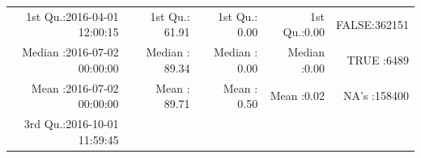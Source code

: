 \documentclass[
  10pt,
  a4paper,oneside]{article}
\begin{document}
\begin{longtable}[]{@{}rrrrr@{}}
\begin{minipage}[t]{0.27\columnwidth}
1st Qu.:2016-04-01 12:00:15\strut
\end{minipage} & \begin{minipage}[t]{0.16\columnwidth}\raggedleft
1st Qu.: 61.91\strut
\end{minipage} & \begin{minipage}[t]{0.15\columnwidth}\raggedleft
1st Qu.: 0.00\strut
\end{minipage} & \begin{minipage}[t]{0.14\columnwidth}\raggedleft
1st Qu.:0.00\strut
\end{minipage} & \begin{minipage}[t]{0.15\columnwidth}\raggedleft
FALSE:362151\strut
\end{minipage}\tabularnewline
\begin{minipage}[t]{0.27\columnwidth}\raggedleft
Median :2016-07-02 00:00:00\strut
\end{minipage} & \begin{minipage}[t]{0.16\columnwidth}\raggedleft
Median : 89.34\strut
\end{minipage} & \begin{minipage}[t]{0.15\columnwidth}\raggedleft
Median : 0.00\strut
\end{minipage} & \begin{minipage}[t]{0.14\columnwidth}\raggedleft
Median :0.00\strut
\end{minipage} & \begin{minipage}[t]{0.15\columnwidth}\raggedleft
TRUE :6489\strut
\end{minipage}\tabularnewline
\begin{minipage}[t]{0.27\columnwidth}\raggedleft
Mean :2016-07-02 00:00:00\strut
\end{minipage} & \begin{minipage}[t]{0.16\columnwidth}\raggedleft
Mean : 89.71\strut
\end{minipage} & \begin{minipage}[t]{0.15\columnwidth}\raggedleft
Mean : 0.50\strut
\end{minipage} & \begin{minipage}[t]{0.14\columnwidth}\raggedleft
Mean :0.02\strut
\end{minipage} & \begin{minipage}[t]{0.15\columnwidth}\raggedleft
NA's :158400\strut
\end{minipage}\tabularnewline
\begin{minipage}[t]{0.27\columnwidth}\raggedleft
3rd Qu.:2016-10-01 11:59:45\strut
\end{minipage} & \begin{minipage}[t]{0.16\columnwidth}\raggedleft

\end{minipage}
\end{longtable}
\end{document}
